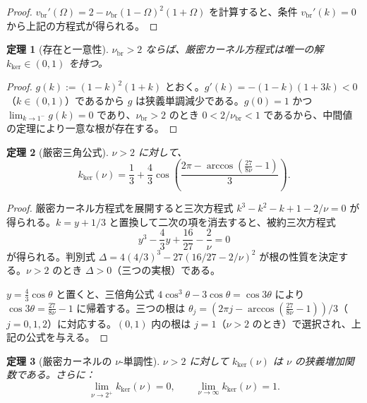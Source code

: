 \documentclass[12pt]{article}
\theoremstyle{plain}
\newtheorem{theorem}{定理}[section]
\theoremstyle{definition}
\numberwithin{equation}{section}
\newcommand{\br}{\mathrm{br}}
\newcommand{\kker}{\mathrm{ker}}
\begin{document}
\begin{proof}
$v_{\br}'(\Omega) = 2 - \nu_{\br}(1-\Omega)^2(1+\Omega)$ を計算すると、条件 $v_{\br}'(k)=0$ から上記の方程式が得られる。
\end{proof}

\begin{theorem}[存在と一意性]\label{thm:existence}
$\nu_{\br}>2$ ならば、厳密カーネル方程式は唯一の解 $k_{\kker}\in(0,1)$ を持つ。
\end{theorem}

\begin{proof}
$g(k):=(1-k)^2(1+k)$ とおく。$g'(k)=-(1-k)(1+3k)<0$（$k\in(0,1)$）であるから $g$ は狭義単調減少である。$g(0)=1$ かつ $\lim_{k\to 1^-}g(k)=0$ であり、$\nu_{\br}>2$ のとき $0<2/\nu_{\br}<1$ であるから、中間値の定理により一意な根が存在する。
\end{proof}

\begin{theorem}[厳密三角公式]\label{thm:trigformula}
$\nu>2$ に対して、
\begin{equation}
\boxed{k_{\kker}(\nu) = \frac{1}{3} + \frac{4}{3}\cos\!\left(\frac{2\pi-\arccos\!\left(\frac{27}{8\nu}-1\right)}{3}\right).}
\end{equation}
\end{theorem}

\begin{proof}
厳密カーネル方程式を展開すると三次方程式 $k^3-k^2-k+1-2/\nu=0$ が得られる。$k=y+1/3$ と置換して二次の項を消去すると、被約三次方程式
\begin{equation}
y^3-\frac{4}{3}y+\frac{16}{27}-\frac{2}{\nu}=0
\end{equation}
が得られる。判別式 $\Delta=4(4/3)^3-27(16/27-2/\nu)^2$ が根の性質を決定する。$\nu>2$ のとき $\Delta>0$（三つの実根）である。

$y=\frac{4}{3}\cos\theta$ と置くと、三倍角公式 $4\cos^3\theta-3\cos\theta=\cos 3\theta$ により $\cos 3\theta=\frac{27}{8\nu}-1$ に帰着する。三つの根は $\theta_j=(2\pi j-\arccos(\frac{27}{8\nu}-1))/3$（$j=0,1,2$）に対応する。$(0,1)$ 内の根は $j=1$（$\nu>2$ のとき）で選択され、上記の公式を与える。
\end{proof}

\begin{theorem}[厳密カーネルの $\nu$-単調性]\label{thm:numonotone}
$\nu>2$ に対して $k_{\kker}(\nu)$ は $\nu$ の狭義増加関数である。さらに：
\begin{equation}
\lim_{\nu\to 2^+}k_{\kker}(\nu)=0,\qquad \lim_{\nu\to\infty}k_{\kker}(\nu)=1.
\end{equation}
\end{theorem}
\end{document}

